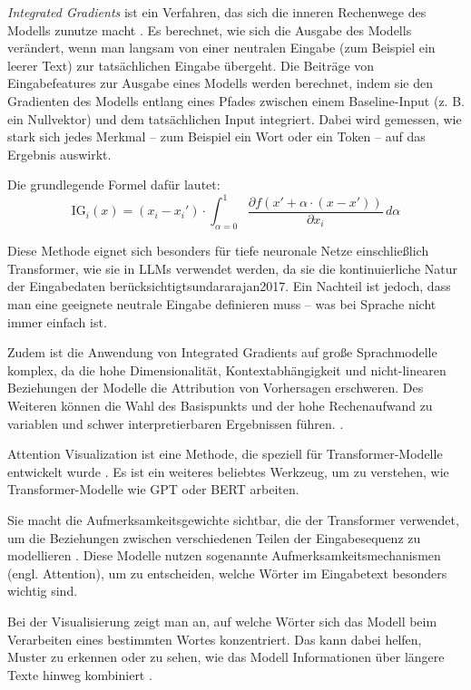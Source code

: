     \textit{Integrated Gradients} ist ein Verfahren, das sich die inneren Rechenwege des Modells zunutze macht \autocite[S. 1]{sundararajan2017}.
    Es berechnet, wie sich die Ausgabe des Modells verändert, wenn man langsam von einer neutralen Eingabe (zum Beispiel ein leerer Text) zur tatsächlichen Eingabe übergeht.
    Die Beiträge von Eingabefeatures zur Ausgabe eines Modells werden berechnet, indem sie den Gradienten des Modells entlang eines Pfades zwischen einem Baseline-Input (z. B. ein Nullvektor) und dem tatsächlichen Input integriert.
    Dabei wird gemessen, wie stark sich jedes Merkmal – zum Beispiel ein Wort oder ein Token – auf das Ergebnis auswirkt.

    Die grundlegende Formel dafür lautet:
    \begin{equation}
    \mathrm{IG}_i(x) = (x_i - x_i') \cdot \int_{\alpha=0}^{1} \frac{\partial f(x' + \alpha \cdot (x - x'))}{\partial x_i} \, d\alpha
    \end{equation}

    Diese Methode eignet sich besonders für tiefe neuronale Netze einschließlich Transformer, wie sie in \acs{LLM}s verwendet werden, da sie die kontinuierliche Natur der Eingabedaten berücksichtigt{sundararajan2017}.
    Ein Nachteil ist jedoch, dass man eine geeignete neutrale Eingabe definieren muss -- was bei Sprache nicht immer einfach ist.

    Zudem ist die Anwendung von Integrated Gradients auf große Sprachmodelle komplex, da die hohe Dimensionalität, Kontextabhängigkeit und nicht-linearen Beziehungen der Modelle die Attribution von Vorhersagen erschweren.
    Des Weiteren können die Wahl des Basispunkts und der hohe Rechenaufwand zu variablen und schwer interpretierbaren Ergebnissen führen. \autocite{sundararajan2017, vaswani2017}.

    Attention Visualization ist eine Methode, die speziell für Transformer-Modelle entwickelt wurde \autocite[S. 1]{abnar2020}.
    Es ist ein weiteres beliebtes Werkzeug, um zu verstehen, wie Transformer-Modelle wie \acs{GPT} oder \acs{BERT} arbeiten.

    Sie macht die Aufmerksamkeitsgewichte sichtbar, die der Transformer verwendet, um die Beziehungen zwischen verschiedenen Teilen der Eingabesequenz zu modellieren \autocite{abnar2020, vaswani2017}.
    Diese Modelle nutzen sogenannte Aufmerksamkeitsmechanismen (engl. Attention), um zu entscheiden, welche Wörter im Eingabetext besonders wichtig sind.

    Bei der Visualisierung zeigt man an, auf welche Wörter sich das Modell beim Verarbeiten eines bestimmten Wortes konzentriert.
    Das kann dabei helfen, Muster zu erkennen oder zu sehen, wie das Modell Informationen über längere Texte hinweg kombiniert \autocite{abnar2020, vaswani2017}.

